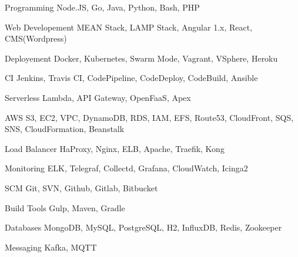 

\begin{cvskills}


\cvskill
{Programming} %
{Node.JS, Go, Java, Python, Bash, PHP} %


\cvskill
{Web Developement} %
{MEAN Stack, LAMP Stack, Angular 1.x, React, CMS(Wordpress)} %

\cvskill
{Deployement} %
{Docker, Kubernetes, Swarm Mode, Vagrant, VSphere, Heroku} %

\cvskill
{CI} %
{Jenkins, Travis CI, CodePipeline, CodeDeploy, CodeBuild, Ansible} %

\cvskill
{Serverless} %
{Lambda, API Gateway, OpenFaaS, Apex} %


\cvskill
{AWS} %
{S3, EC2, VPC, DynamoDB, RDS, IAM, EFS, Route53, CloudFront, SQS, SNS, CloudFormation, Beanstalk} %

\cvskill
{Load Balancer} %
{HaProxy, Nginx, ELB, Apache, Traefik, Kong} %

\cvskill
{Monitoring} %
{ELK, Telegraf, Collectd, Grafana, CloudWatch, Icinga2} %

\cvskill
{SCM} %
{Git, SVN, Github, Gitlab, Bitbucket} %

\cvskill
{Build Tools} %
{Gulp, Maven, Gradle} %


\cvskill
{Databases} %
{MongoDB, MySQL, PostgreSQL, H2, InfluxDB, Redis, Zookeeper} %

\cvskill
{Messaging} %
{Kafka, MQTT} %


\end{cvskills}
